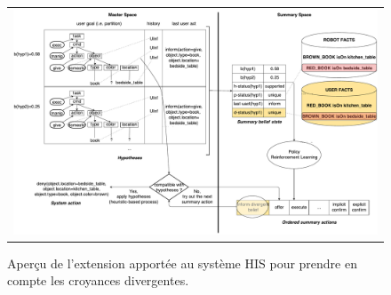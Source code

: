 \documentclass[a4paper,11pt,twoside]{StyleThese}
\begin{document}
\clearpage

\begin{figure}
 \centering
 \begin{tabular}{c}
  \includegraphics[width=1.0\textwidth]{img/MaRDHIS.pdf}
 \end{tabular}
 \caption{Aperçu de l'extension apportée au système HIS pour prendre en compte les croyances divergentes.}
 \label{fig:overview-mardhis}
\end{figure}


\clearpage
\end{document}
